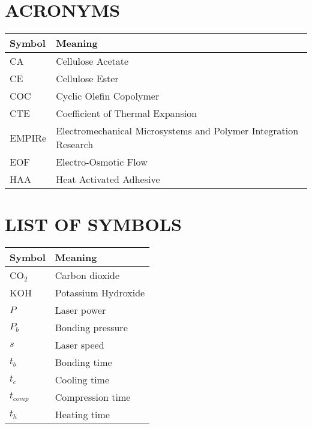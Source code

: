 

\chapter*{\center\Huge{ACRONYMS}}



\begin{center}
\small
\begin{longtable}{ll}\hline  
\textbf{Symbol} & \textbf{Meaning}\\\hline
CA & Cellulose Acetate\\
CE & Cellulose Ester\\
COC & Cyclic Olefin Copolymer\\
CTE &Coefficient of Thermal Expansion\\
EMPIRe & Electromechanical Microsystems and Polymer Integration Research\\
EOF & Electro-Osmotic Flow\\
HAA & Heat Activated Adhesive\\


\hline
\end{longtable} 
\end{center}

\chapter*{\center\Huge{LIST OF SYMBOLS}}



\begin{center}
\begin{tabular}{ll}\hline
\textbf{Symbol} & \textbf{Meaning}\\\hline
CO$_2$ & Carbon dioxide\\
KOH& Potassium Hydroxide\\ 
$P$ & Laser power\\
$P_b$ & Bonding pressure\\
$s$ & Laser speed\\
$t_b$ & Bonding time\\
$t_c$ & Cooling time\\
$t_{comp}$ & Compression time\\
$t_h$ & Heating time\\

\hline
\end{tabular}
\end{center}
